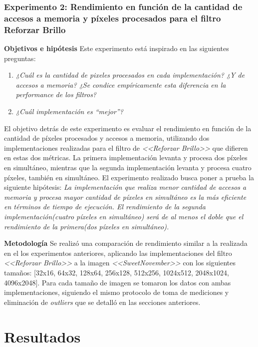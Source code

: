 \documentclass[a4paper]{article}
\begin{document}
\subsubsection{Experimento 2: Rendimiento en función de la cantidad de accesos a memoria y píxeles procesados para el filtro Reforzar Brillo}

\justify
\textbf{Objetivos e hipótesis}
\justify
Este experimento está inspirado en las siguientes preguntas:
\justify
\begin{enumerate}
	\item \textit{¿Cuál es la cantidad de pixeles procesados en cada implementación? ¿Y de accesos a memoria? ¿Se condice empíricamente esta diferencia en la performance de los filtros?}
	\item \textit{¿Cuál implementación es “mejor”?}	 
\end{enumerate}
\justify
El objetivo detrás de este experimento es evaluar el rendimiento en función de la cantidad de píxeles procesados y accesos a memoria, utilizando dos implementaciones realizadas para el filtro de \textit{<<Reforzar Brillo>>} que difieren en estas dos métricas. La primera implementación levanta y procesa dos píxeles en simultáneo, mientras que la segunda implementación levanta y procesa cuatro píxeles, también en simultáneo. El experimento realizado busca poner a prueba la siguiente hipótesis:
\justify
\textit{La implementación que realiza menor cantidad de accesos a memoria y procesa mayor cantidad de píxeles en simultáneo es la más eficiente en términos de tiempo de ejecución. El rendimiento de la segunda implementación(cuatro píxeles en simultáneo) será de al menos el doble que el rendimiento de la primera(dos píxeles en simultáneo). }

\justify
\textbf{Metodología}
\justify
Se realizó una comparación de rendimiento similar a la realizada en el los experimentos anteriores, aplicando las implementaciones del filtro \textit{<<Reforzar Brillo>>} a la imagen \textit{<<SweetNovember>>} con los siguientes tamaños: [32x16, 64x32, 128x64, 256x128, 512x256, 1024x512, 2048x1024, 4096x2048]. Para cada tamaño de imagen se tomaron los datos con ambas implementaciones, siguiendo el mismo protocolo de toma de mediciones y eliminación de \textit{outliers} que se detalló en las secciones anteriores.




\section{Resultados}
\end{document}
